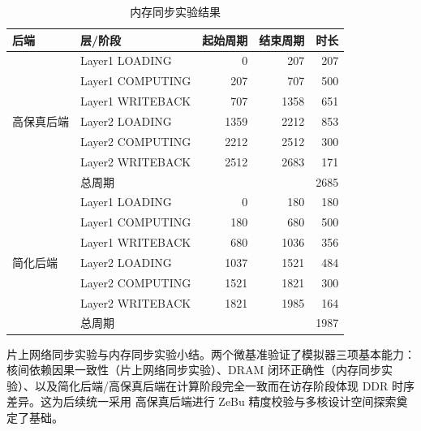 \begin{table}[H]
  \centering
  \caption{内存同步实验结果}
  \label{tab:mb2}
  \small
  \begin{tabular*}{\textwidth}{@{\extracolsep{\fill}}llrrr}
    \toprule
    后端 & 层/阶段 & 起始周期 & 结束周期 & 时长 \\
    \midrule
    \multirow{7}{*}{高保真后端} & Layer1 LOADING    & 0    & 207  & 207 \\
                                    & Layer1 COMPUTING  & 207  & 707  & 500 \\
                                    & Layer1 WRITEBACK  & 707  & 1358 & 651 \\
                                    & Layer2 LOADING    & 1359 & 2212 & 853 \\
                                    & Layer2 COMPUTING  & 2212 & 2512 & 300 \\
                                    & Layer2 WRITEBACK  & 2512 & 2683 & 171 \\
    \cmidrule{2-5}
                                    & 总周期 & \multicolumn{3}{r}{2685} \\
    \midrule
    \multirow{7}{*}{简化后端} & Layer1 LOADING    & 0    & 180  & 180 \\
                             & Layer1 COMPUTING  & 180  & 680  & 500 \\
                             & Layer1 WRITEBACK  & 680  & 1036 & 356 \\
                             & Layer2 LOADING    & 1037 & 1521 & 484 \\
                             & Layer2 COMPUTING  & 1521 & 1821 & 300 \\
                             & Layer2 WRITEBACK  & 1821 & 1985 & 164 \\
    \cmidrule{2-5}
                             & 总周期 & \multicolumn{3}{r}{1987} \\
    \bottomrule
  \end{tabular*}
\end{table}

片上网络同步实验与内存同步实验小结。两个微基准验证了模拟器三项基本能力：核间依赖因果一致性（片上网络同步实验）、DRAM 闭环正确性（内存同步实验）、以及简化后端/高保真后端在计算阶段完全一致而在访存阶段体现 DDR 时序差异。这为后续统一采用 高保真后端进行 ZeBu 精度校验与多核设计空间探索奠定了基础。

\label{subsec:c5_zebu}

